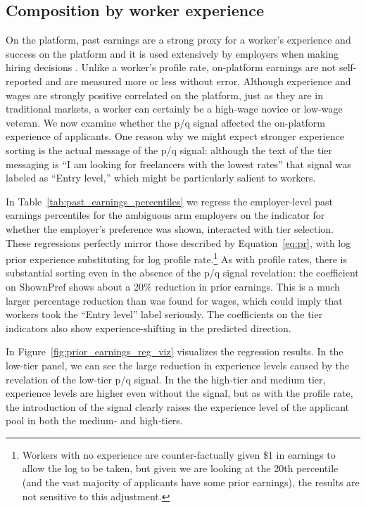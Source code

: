 \subsection{Composition by worker experience} 
On the platform, past earnings are a strong proxy for a worker's experience and success on the platform and it is used extensively by employers when making hiring decisions \citep{pallais2010inefficient}.
Unlike a worker's profile rate, on-platform earnings are not self-reported and are measured more or less without error. 
Although experience and wages are strongly positive correlated on the platform, just as they are in traditional markets, a worker can certainly be a high-wage novice or low-wage veteran.
We now examine whether the p/q signal affected the on-platform experience of applicants.
One reason why we might expect stronger experience sorting is the actual message of the p/q signal:  
although the text of the tier messaging is ``I am looking for freelancers with the lowest rates'' that signal was labeled as ``Entry level,'' which might be particularly salient to workers. 



In Table~\ref{tab:past_earnings_percentiles} we regress the employer-level past earnings percentiles for the ambiguous arm employers on the indicator for whether the employer's preference was shown, interacted with tier selection.
These regressions perfectly mirror those described by Equation~\ref{eq:pr}, with log prior experience substituting for log profile rate.\footnote{
  Workers with no experience are counter-factually given \$1 in earnings to allow the log to be taken, but given we are looking at the 20th percentile (and the vast majority of applicants have some prior earnings), the results are not sensitive to this adjustment.}
As with profile rates, there is substantial sorting even in the absence of the p/q signal revelation:
the coefficient on $\mbox{ShownPref}$ shows about a 20\% reduction in prior earnings.
This is a much larger percentage reduction than was found for wages, which could imply that workers took the ``Entry level'' label seriously. 
The coefficients on the tier indicators also show experience-shifting in the predicted direction. 

In Figure~\ref{fig:prior_earnings_reg_viz} visualizes the regression results.
In the low-tier panel, we can see the large reduction in experience levels caused by the revelation of the low-tier p/q signal.
In the the high-tier and medium tier, experience levels are higher even without the signal, but as with the profile rate, the introduction of the signal clearly raises the experience level of the applicant pool in both the medium- and high-tiers. 

